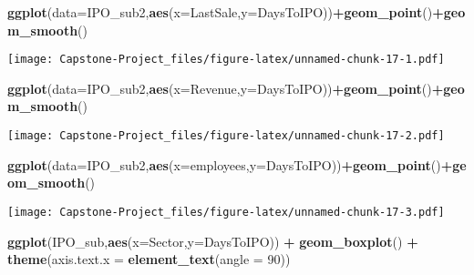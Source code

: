 \documentclass[]{article}
\newenvironment{Shaded}{\begin{snugshade}}{\end{snugshade}}
\newcommand{\DataTypeTok}[1]{\textcolor[rgb]{0.13,0.29,0.53}{#1}}
\newcommand{\DecValTok}[1]{\textcolor[rgb]{0.00,0.00,0.81}{#1}}
\newcommand{\KeywordTok}[1]{\textcolor[rgb]{0.13,0.29,0.53}{\textbf{#1}}}
\newcommand{\NormalTok}[1]{#1}
\newcommand{\OperatorTok}[1]{\textcolor[rgb]{0.81,0.36,0.00}{\textbf{#1}}}
\newcommand{\StringTok}[1]{\textcolor[rgb]{0.31,0.60,0.02}{#1}}
\begin{document}
\begin{Shaded}
\begin{Highlighting}[]
\KeywordTok{ggplot}\NormalTok{(}\DataTypeTok{data=}\NormalTok{IPO_sub2,}\KeywordTok{aes}\NormalTok{(}\DataTypeTok{x=}\NormalTok{LastSale,}\DataTypeTok{y=}\NormalTok{DaysToIPO))}\OperatorTok{+}\KeywordTok{geom_point}\NormalTok{()}\OperatorTok{+}\KeywordTok{geom_smooth}\NormalTok{()}
\end{Highlighting}
\end{Shaded}

\texttt{[image: Capstone-Project\_files/figure-latex/unnamed-chunk-17-1.pdf]}

\begin{Shaded}
\begin{Highlighting}[]
\KeywordTok{ggplot}\NormalTok{(}\DataTypeTok{data=}\NormalTok{IPO_sub2,}\KeywordTok{aes}\NormalTok{(}\DataTypeTok{x=}\NormalTok{Revenue,}\DataTypeTok{y=}\NormalTok{DaysToIPO))}\OperatorTok{+}\KeywordTok{geom_point}\NormalTok{()}\OperatorTok{+}\KeywordTok{geom_smooth}\NormalTok{()}
\end{Highlighting}
\end{Shaded}

\texttt{[image: Capstone-Project\_files/figure-latex/unnamed-chunk-17-2.pdf]}

\begin{Shaded}
\begin{Highlighting}[]
\KeywordTok{ggplot}\NormalTok{(}\DataTypeTok{data=}\NormalTok{IPO_sub2,}\KeywordTok{aes}\NormalTok{(}\DataTypeTok{x=}\NormalTok{employees,}\DataTypeTok{y=}\NormalTok{DaysToIPO))}\OperatorTok{+}\KeywordTok{geom_point}\NormalTok{()}\OperatorTok{+}\KeywordTok{geom_smooth}\NormalTok{()}
\end{Highlighting}
\end{Shaded}

\texttt{[image: Capstone-Project\_files/figure-latex/unnamed-chunk-17-3.pdf]}

\begin{Shaded}
\begin{Highlighting}[]
\KeywordTok{ggplot}\NormalTok{(IPO_sub,}\KeywordTok{aes}\NormalTok{(}\DataTypeTok{x=}\NormalTok{Sector,}\DataTypeTok{y=}\NormalTok{DaysToIPO)) }\OperatorTok{+}
\StringTok{  }\KeywordTok{geom_boxplot}\NormalTok{() }\OperatorTok{+}\StringTok{ }
\StringTok{  }\KeywordTok{theme}\NormalTok{(}\DataTypeTok{axis.text.x =} \KeywordTok{element_text}\NormalTok{(}\DataTypeTok{angle =} \DecValTok{90}\NormalTok{))}
\end{Highlighting}
\end{Shaded}
\end{document}
